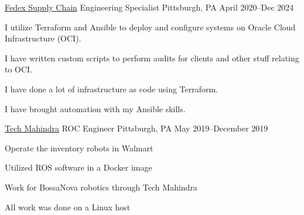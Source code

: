 


\begin{cventries}

\cventry
    {\href{www.fedex.com}{Fedex Supply Chain}}
    {Engineering Specialist}
       {Pittsburgh, PA} {April 2020--Dec 2024}
    {
    \begin{cvitems}
    \item I utilize Terraform and Ansible to deploy and configure systems on Oracle Cloud Infrastructure (OCI).
    \item I have written custom scripts to perform audits for clients and other stuff relating to OCI.
    \item I have done a lot of infrastructure as code using Terraform.
    \item I have brought automation with my Ansible skills.
    \end{cvitems}
    }
\cventry
    {\href{www.techmahindra.com}{Tech Mahindra}}
    {ROC Engineer}
    {Pittsburgh, PA} {May 2019--December 2019}
    {
    \begin{cvitems}
    \item Operate the inventory robots in Walmart
    \item Utilized ROS software in a Docker image
    \item Work for BossaNova robotics through Tech Mahindra
    \item All work was done on a Linux host
    \end{cvitems}
    }


\end{cventries}
